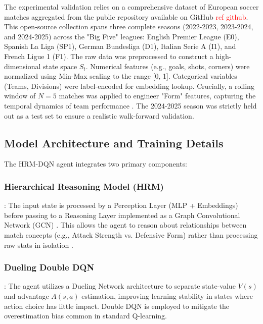 \documentclass[3p,times,procedia]{elsarticle}
\begin{document}
The experimental validation relies on a comprehensive dataset of European soccer matches aggregated from the public repository available on GitHub \textcolor{red}{ref github}. This open-source collection spans three complete seasons (2022-2023, 2023-2024, and 2024-2025) across the "Big Five" leagues: English Premier League (E0), Spanish La Liga (SP1), German Bundesliga (D1), Italian Serie A (I1), and French Ligue 1 (F1).
The raw data was preprocessed to construct a high-dimensional state space $S_t$. Numerical features (e.g., goals, shots, corners) were normalized using Min-Max scaling to the range [0, 1]. Categorical variables (Teams, Divisions) were label-encoded for embedding lookup. Crucially, a rolling window of $N=5$ matches was applied to engineer "Form" features, capturing the temporal dynamics of team performance \cite{dixon1997modelling}. The 2024-2025 season was strictly held out as a test set to ensure a realistic walk-forward validation.


\subsection{Model Architecture and Training Details}
The HRM-DQN agent integrates two primary components:
\subsubsection{Hierarchical Reasoning Model (HRM)}: The input state is processed by a Perception Layer (MLP + Embeddings) before passing to a Reasoning Layer implemented as a Graph Convolutional Network (GCN) \cite{kipf2016semi}. This allows the agent to reason about relationships between match concepts (e.g., Attack Strength vs. Defensive Form) rather than processing raw stats in isolation \cite{wang2025hierarchical}.
\subsubsection{Dueling Double DQN}: The agent utilizes a Dueling Network architecture \cite{wang2016dueling} to separate state-value $V(s)$ and advantage $A(s,a)$ estimation, improving learning stability in states where action choice has little impact. Double DQN \cite{van2016deep} is employed to mitigate the overestimation bias common in standard Q-learning.
\end{document}
